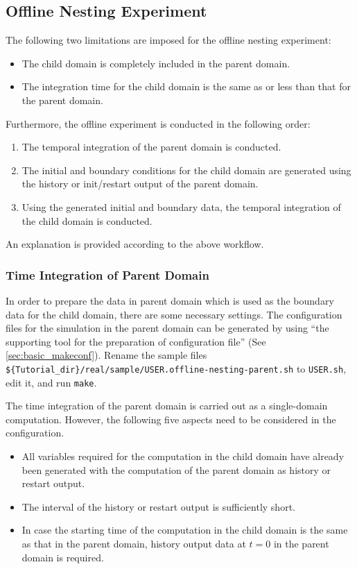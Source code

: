 \subsection{Offline Nesting Experiment} \label{subsec:nest_offline}

The following two limitations are imposed for the offline nesting experiment:
\begin{itemize}
 \item The child domain is completely included in the parent domain.
 \item The integration time for the child domain is the same as or less than that for the parent domain.
\end{itemize}
Furthermore, the offline experiment is conducted in the following order:
\begin{enumerate}
 \item The temporal integration of the parent domain is conducted.
 \item The initial and boundary conditions for the child domain are generated using the history or init/restart output of the parent domain.
 \item Using the generated initial and boundary data, the temporal integration of the child domain is conducted.
\end{enumerate}
An explanation is provided according to the above workflow.


\subsubsection{Time Integration of Parent Domain}

In order to prepare the data in parent domain which is used as the boundary data for the child domain, there are some necessary settings.
The configuration files for the simulation in the parent domain can be generated by using ``the supporting tool for the preparation of configuration file'' (See \ref{sec:basic_makeconf}).
Rename the sample files \\ \verb|${Tutorial_dir}/real/sample/USER.offline-nesting-parent.sh| to \verb|USER.sh|, edit it, and run \verb|make|.

The time integration of the parent domain is carried out as a single-domain computation.
However, the following five aspects need to be considered in the configuration.
\begin{itemize}
 \item All variables required for the computation in the child domain have already been generated with the computation of the parent domain as history or restart output.
 \item The interval of the history or restart output is sufficiently short.
 \item In case the starting time of the computation in the child domain is the same as that in the parent domain, history output data at $t=0$ in the parent domain is required.
\end{itemize}


